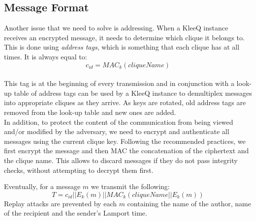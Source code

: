 \documentclass[a4paper, 12pt]{report}
\begin{document}
\subsection{Message Format}
\label{ssec:prep.proto.msg_fmt}
Another issue that we need to solve is addressing. When a KleeQ instance receives an encrypted message, it needs to determine which clique it belongs to. This is done using \emph{address tags}, which is something that each clique has at all times. It is always equal to:
\begin{equation*}
    c_{id} = MAC_{k}(cliqueName)
\end{equation*} \\
This tag is at the beginning of every transmission and in conjunction with a look-up table of address tags can be used by a KleeQ instance to demultiplex messages into appropriate cliques as they arrive. As keys are rotated, old address tags are removed from the look-up table and new ones are added.\\

In addition, to protect the content of the communication from being viewed and/or modified by the adversary, we need to encrypt and authenticate all messages using the current clique key. Following the recommended practices, we first encrypt the message and then MAC the concatenation of the ciphertext and the clique name. This allows to discard messages if they do not pass integrity checks, without attempting to decrypt them first.

Eventually, for a message $m$ we transmit the following:
\begin{equation*}
    T = c_{id} || E_k(m) || MAC_k(cliqueName || E_k(m))
\end{equation*}
Replay attacks are prevented by each $m$ containing the name of the author, name of the recipient and the sender's Lamport time.
\end{document}
